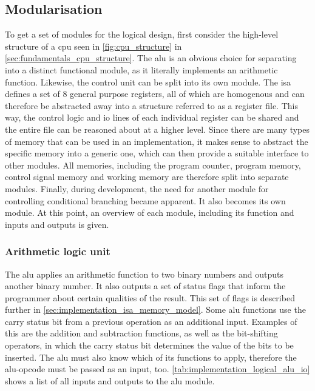 \subsection{Modularisation}

To get a set of modules for the logical design, first consider the high-level structure of a \ac{cpu} seen in \autoref{fig:cpu_structure} in \autoref{sec:fundamentals_cpu_structure}. The \ac{alu} is an obvious choice for separating into a distinct functional module, as it literally implements an arithmetic function. Likewise, the control unit can be 
split into its own module. The \ac{isa} defines a set of 8 general purpose registers, all of which are homogenous and can therefore be abstracted away into a structure referred to as a register file. This way, the control logic and \ac{io} lines of each individual register can be shared and the entire file can be reasoned about at a higher level. Since there are many types of memory that can be used in an implementation, it makes sense to abstract the specific memory into a generic one, which can then provide a suitable interface to other modules. All memories, including the program counter, program memory, control signal memory and working memory are therefore split into separate modules. Finally, during development, the need for another module for controlling conditional branching became apparent. It also becomes its own module. At this point, an overview of each module, including its function and inputs and outputs is given.

\subsubsection{Arithmetic logic unit}

The \ac{alu} applies an arithmetic function to two binary numbers and outputs another binary number. It also outputs a set of status flags that inform the programmer about certain qualities of the result. This set of flags is described further in \autoref{sec:implementation_isa_memory_model}. Some \ac{alu} functions use the carry status bit from a previous operation as an additional input. Examples of this are the addition and subtraction functions, as well as the bit-shifting operators, in which the carry status bit determines the value of the bits to be inserted. The \ac{alu} must also know which of its functions to apply, therefore the \ac{alu}-opcode must be passed as an input, too. \autoref{tab:implementation_logical_alu_io} shows a list of all inputs and outputs to the \ac{alu} module.

